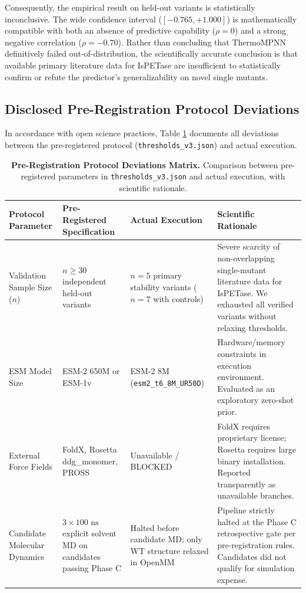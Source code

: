\documentclass[11pt,a4paper]{article}
\begin{document}
Consequently, the empirical result on held-out variants is statistically inconclusive. The wide confidence interval ($[-0.765, +1.000]$) is mathematically compatible with both an absence of predictive capability ($\rho = 0$) and a strong negative correlation ($\rho = -0.70$). Rather than concluding that ThermoMPNN definitively failed out-of-distribution, the scientifically accurate conclusion is that available primary literature data for IsPETase are insufficient to statistically confirm or refute the predictor's generalizability on novel single mutants.

\subsection{Disclosed Pre-Registration Protocol Deviations}
In accordance with open science practices, Table \ref{tab:deviations} documents all deviations between the pre-registered protocol (\texttt{thresholds\_v3.json}) and actual execution.

\begin{table}[H]
\centering
\small
\caption{\textbf{Pre-Registration Protocol Deviations Matrix.} Comparison between pre-registered parameters in \texttt{thresholds\_v3.json} and actual execution, with scientific rationale.}
\label{tab:deviations}
\begin{tabularx}{\textwidth}{p{3.2cm}p{3.5cm}Xp{4.2cm}}
\toprule
\textbf{Protocol Parameter} & \textbf{Pre-Registered Specification} & \textbf{Actual Execution} & \textbf{Scientific Rationale} \\
\midrule
Validation Sample Size ($n$) & $n \geq 30$ independent held-out variants & $n = 5$ primary stability variants ($n = 7$ with controls) & Severe scarcity of non-overlapping single-mutant literature data for IsPETase. We exhausted all verified variants without relaxing thresholds. \\
ESM Model Size & ESM-2 650M or ESM-1v & ESM-2 8M (\texttt{esm2\_t6\_8M\_UR50D}) & Hardware/memory constraints in execution environment. Evaluated as an exploratory zero-shot prior. \\
External Force Fields & FoldX, Rosetta ddg\_monomer, PROSS & Unavailable / BLOCKED & FoldX requires proprietary license; Rosetta requires large binary installation. Reported transparently as unavailable branches. \\
Candidate Molecular Dynamics & $3 \times 100\text{ ns}$ explicit solvent MD on candidates passing Phase C & Halted before candidate MD; only WT structure relaxed in OpenMM & Pipeline strictly halted at the Phase C retrospective gate per pre-registration rules. Candidates did not qualify for simulation expense. \\
\bottomrule
\end{tabularx}
\end{table}
\end{document}
